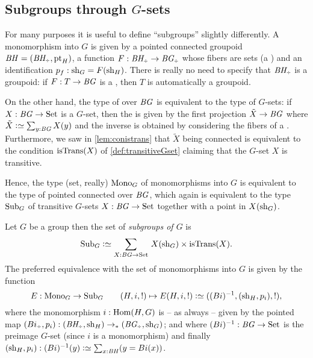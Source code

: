 \subsection{Subgroups through $G$-sets}

For many purposes it is useful to define ``subgroups'' slightly differently.
A monomorphism into $G$ is given by a pointed connected groupoid  $\BH=(\BH_\div,\pt_H)$, a function $F:\BH_\div\to\BG_\div$ whose fibers are sets (a \covering) and an identification $p_f:\mathrm{sh}_G=F(\mathrm{sh}_H)$.  There is really no need to specify that $\BH_\div$ is a groupoid: if $F:T\to \mathit{B}\mathit{G}$ is a \covering, then $T$ is automatically a groupoid.

On the other hand,  the type of \coverings over $\mathit{B}\mathit{G}$ is equivalent to the type of $G$-sets: if $X:\mathit{B}\mathit{G}\to\mathrm{Set}$ is a $G$-set, then the \covering is given by the first projection $\tilde X\to \mathit{B}\mathit{G}$ where $\tilde X\defequi\sum_{y:\BG}X(y)$ and the inverse is obtained by considering the fibers of a \covering.  Furthermore, we saw in \cref{lem:conistrans} that $\tilde X$ being connected is equivalent to the condition $\istrans(X)$ of \cref{def:transitiveGset} claiming that the $G$-set $X$ is transitive.

Hence, the type (set, really) $\mathrm{Mono}_G$ of monomorphisms into $G$ is equivalent to the type of pointed connected \coverings over $\mathit{B}\mathit{G}$, which again is equivalent to the type $\mathrm{Sub}_G$ of transitive $G$-sets $X:\mathit{B}\mathit{G}\to\mathrm{Set}$ together with a point in $X(\mathrm{sh}_G)$.

\begin{definition}
  Let $G$ be a group then the set of \emph{subgroups of $G$} is
  $$\typesubgroup_G\defequi\sum_{X:\BG\to\Set}{\,}X(\shape_G)\times\mathrm{isTrans}(X).$$
  The preferred equivalence
  with the set of monomorphisms into $G$ is given by the function
  $$E:\typemono_G\to\typesubgroup_G\qquad (H,i,!)\mapsto E(H,i,!)\defequi ((Bi)^{-1},(\shape_H,p_i),!),$$
  where the monomorphism $i:\Hom(H,G)$ is -- as always -- given by the pointed map $(Bi_\div,p_i):(\BH_\div,\shape_H)\to_*(\BG_\div,\shape_G)$; and where $(Bi)^{-1}:\mathit{B}\mathit{G}\to\mathrm{Set}$ is the preimage $G$-set (since $i$ is a monomorphism)  and finally $(\shape_H,p_i):(Bi)^{-1}(y)\defequi \sum_{x:\BH}(y=Bi(x))$.
\end{definition}

